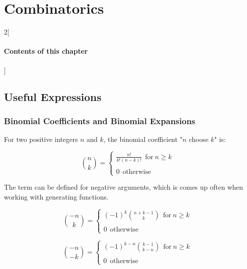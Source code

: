 \chapter{Combinatorics}

\begin{multicols}{2}[\subsubsection*{Contents of this chapter}]
\end{multicols}



\section{Useful Expressions}



\subsection{Binomial Coefficients and Binomial Expansions}

For two positive integers $n$ and $k$, the binomial coefficient "$n$ choose $k$" is:

\begin{equation}
{n \choose k} = \left\{ \begin{array}{c} 
\frac{n!}{k!(n-k)!}\ \ \mathrm{for\ }n\geq k\\
\\
0 \ \ \mathrm{otherwise}
\end{array}\right.
\end{equation}

The term can be defined for negative arguments, which is comes up often when working with generating functions.

\begin{equation}
{-n \choose k} = \left\{\begin{array}{c}
(-1)^k { n+k-1 \choose k}\ \ \mathrm{for\ }n\geq k\\
\\
0 \ \ \mathrm{otherwise}
\end{array}\right.
\end{equation}


\begin{equation}
{-n \choose -k} = \left\{\begin{array}{c}
(-1)^{k-n} {k-1 \choose k-n}\ \ \mathrm{for\ }n\geq k\\
\\
0 \ \ \mathrm{otherwise}
\end{array}\right.
\end{equation}


